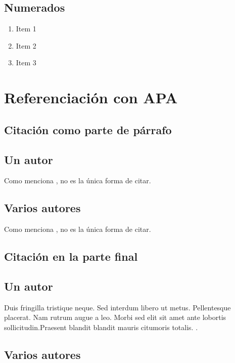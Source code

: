 \subsection{Numerados}
\begin{enumerate}
    \item Item 1
    \item Item 2
    \item Item 3
\end{enumerate}


\section{Referenciación con APA}

\subsection{Citación como parte de párrafo}

\subsection*{Un autor}

Como menciona , no es la única
forma de citar.\\

\subsection*{Varios autores}

Como menciona , no es la única
forma de citar.\\

\subsection{Citación en la parte final}

\subsection*{Un autor}

Duis fringilla tristique neque. Sed interdum libero ut metus.
Pellentesque placerat. Nam rutrum augue a leo. Morbi sed 
elit sit amet ante lobortis sollicitudin.Praesent blandit 
blandit mauris citumoris totalis. \cite{libro:ejemplo}.

\subsection*{Varios autores}

